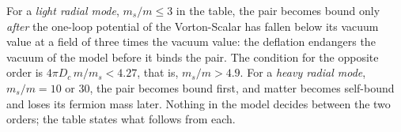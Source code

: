 For a \emph{light radial mode}, $m_s/m\le3$ in the table, the pair becomes bound only \emph{after}
the one-loop potential of the Vorton-Scalar has fallen below its vacuum value at a field of three
times the vacuum value: the deflation endangers the vacuum of the model before it binds the pair. The
condition for the opposite order is $4\pi D_c\,m/m_s<4.27$, that is, $m_s/m>4.9$. For a \emph{heavy
radial mode}, $m_s/m=10$ or $30$, the pair becomes bound first, and matter becomes self-bound and
loses its fermion mass later. Nothing in the model decides between the two orders; the table states
what follows from each.

